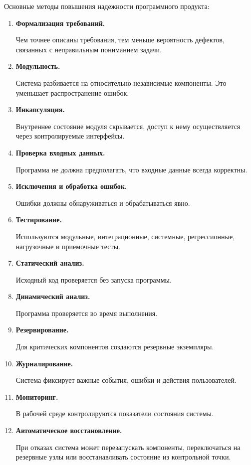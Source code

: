 \documentclass[12pt,a4paper]{article}
\begin{document}
Основные методы повышения надежности программного продукта:

\begin{enumerate}
    \item \textbf{Формализация требований.}

    Чем точнее описаны требования, тем меньше вероятность дефектов, связанных с неправильным пониманием задачи.

    \item \textbf{Модульность.}

    Система разбивается на относительно независимые компоненты. Это уменьшает распространение ошибок.

    \item \textbf{Инкапсуляция.}

    Внутреннее состояние модуля скрывается, доступ к нему осуществляется через контролируемые интерфейсы.

    \item \textbf{Проверка входных данных.}

    Программа не должна предполагать, что входные данные всегда корректны.

    \item \textbf{Исключения и обработка ошибок.}

    Ошибки должны обнаруживаться и обрабатываться явно.

    \item \textbf{Тестирование.}

    Используются модульные, интеграционные, системные, регрессионные, нагрузочные и приемочные тесты.

    \item \textbf{Статический анализ.}

    Исходный код проверяется без запуска программы.

    \item \textbf{Динамический анализ.}

    Программа проверяется во время выполнения.

    \item \textbf{Резервирование.}

    Для критических компонентов создаются резервные экземпляры.

    \item \textbf{Журналирование.}

    Система фиксирует важные события, ошибки и действия пользователей.

    \item \textbf{Мониторинг.}

    В рабочей среде контролируются показатели состояния системы.

    \item \textbf{Автоматическое восстановление.}

    При отказах система может перезапускать компоненты, переключаться на резервные узлы или восстанавливать состояние из контрольной точки.
\end{enumerate}
\end{document}
